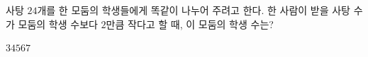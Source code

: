 사탕 $24$개를 한 모둠의 학생들에게 똑같이 나누어 주려고 한다. 한 사람이 받을 사탕 수가 모둠의 학생 수보다 $2$만큼 작다고 할 때, 이 모둠의 학생 수는?
\begin{choices32}{$3$}{$4$}{$5$}{$6$}{$7$}\end{choices32}
